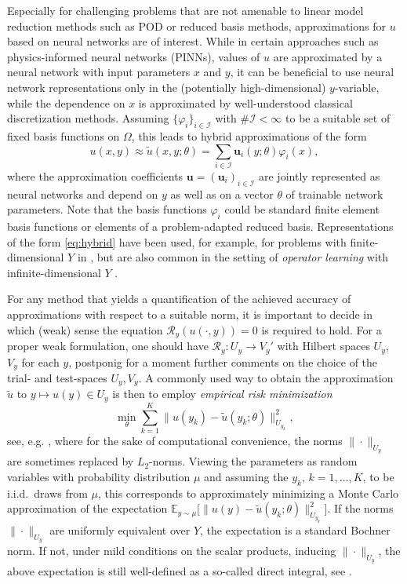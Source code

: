 \documentclass[a4paper,11pt]{amsart}
\providecommand{\norm}[1]{\lVert#1\rVert}
\numberwithin{equation}{section}
\theoremstyle{definition}
\theoremstyle{remark}
\theoremstyle{plain}
\begin{document}
Especially for challenging problems that are not amenable to linear model reduction methods such as POD or  reduced basis methods, approximations for $u$ based on neural networks are of interest. While in certain approaches such as physics-informed neural networks (PINNs), values of
$u$ are approximated by a neural network with input parameters $x$ and $y$,   it can be beneficial to use neural network representations only in the (potentially high-dimensional) $y$-variable, while the dependence on $x$ is approximated by well-understood classical discretization methods. Assuming $\{ \varphi_i \}_{i \in \mathcal I}$ with $\#\mathcal I < \infty$ to be a suitable set of fixed basis functions on $\Omega$, this leads to hybrid approximations of the form
\begin{equation}\label{eq:hybrid}
  u(x,y) \approx  \tilde u(x, y;\theta) = \sum_{i \in \mathcal I} \mathbf{u}_i(y; \theta) \varphi_i(x),
\end{equation}
where the approximation coefficients $\mathbf{u} = (\mathbf{u}_i)_{i \in \mathcal I}$ are jointly represented as neural networks and depend on $y$ as well as on a vector $\theta$ of trainable network parameters. Note that the basis functions $\varphi_i$ could be 
standard finite element basis functions or elements of a problem-adapted reduced basis. Representations of the form \eqref{eq:hybrid} have been used, for example, for problems with finite-dimensional $Y$ in \cite{GPRSK:21,KPRS:22,GHRK:25,BachmayrDahmenOster2024,CDG2025},
but are also common in the setting of \emph{operator learning} with infinite-dimensional $Y$ \cite{BHKS2021,KLLABSA2023}.

For any method that yields a quantification of the achieved accuracy of approximations with respect to a suitable norm, it is important to decide in which (weak) sense the equation
$\mathcal R_y(u(\cdot, y) ) = 0$ is required to hold. For a proper weak formulation, one should have $\mathcal R_y \colon U_y \to V_y'$ with Hilbert spaces $U_y$, $V_y$ for each $y$, postponig for a moment further comments on the choice of the trial- and test-spaces $U_y, V_y$. A commonly used   way to obtain the approximation $\tilde u$ to $y\mapsto u(y)\in U_y$ is then to employ {\em empirical risk minimization}
\begin{equation}\label{eq:solutionregression}
    \min_\theta \sum_{k=1}^K \norm{ u(y_k)  - \tilde u(y_k; \theta) }_{U_{y_k}}^2,
\end{equation}
see, e.g.  \cite{GPRSK:21,KPRS:22}, where for the sake of computational convenience,
the norms $\|\cdot\|_{U_y}$ are sometimes replaced by $L_2$-norms.
Viewing the parameters as random variables with probability distribution $\mu$ and assuming
the $y_k$, $k = 1,\ldots, K$, to be i.i.d.\ draws from $\mu$, this corresponds to approximately minimizing a Monte Carlo approximation of
the expectation $\mathbb{E}_{y\sim \mu}\big[\|u(y)- \tilde u(y_k; \theta)\|^2_{U_{y_k}}\big]$.
If the norms $\|\cdot\|_{U_y}$ are uniformly equivalent over $Y$, the expectation is a standard Bochner norm. If not, under mild conditions on the scalar products, inducing $\|\cdot\|_{U_y}$, the above expectation is still well-defined as a so-called direct integral, see  \cite{BachmayrDahmenOster2024}. 
%
\end{document}
